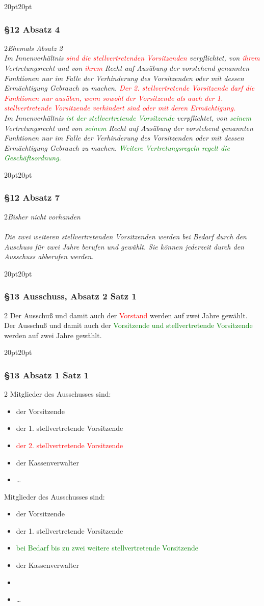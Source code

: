 \documentclass[10pt,a4paper,parskip=half]{scrartcl}
\newcommand{\new}[1]{\textcolor{Green}{#1}}
\newcommand{\old}[1]{\textcolor{Red}{#1}}
\newcommand{\change}[1]{
  \begin{adjustwidth}{20pt}{20pt}
    #1
  \end{adjustwidth}
}
\newcommand{\compare}[3]{\change{\subsubsection*{#1}\begin{multicols}{2}#2\columnbreak\\#3\end{multicols}}}
\begin{document}
\compare{§12 Absatz 4}
{\em Ehemals Absatz 2\em\\
  Im Innenverhältnis \old{sind die stellvertretenden Vorsitzenden} verpflichtet,
  von \old{ihrem} Vertretungsrecht und von \old{ihrem} Recht auf Ausübung der vorstehend genannten Funktionen nur im Falle der Verhinderung des Vorsitzenden oder mit dessen Ermächtigung Gebrauch zu machen.
  \old{Der 2. stellvertretende Vorsitzende darf die Funktionen nur ausüben,
    wenn sowohl der
    Vorsitzende als auch der 1. stellvertretende Vorsitzende verhindert sind oder mit deren Ermächtigung.}
}
{Im Innenverhältnis \new{ist der stellvertretende Vorsitzende} verpflichtet,
  von \new{seinem} Vertretungsrecht und von \new{seinem} Recht auf Ausübung der vorstehend genannten Funktionen nur im Falle der Verhinderung des Vorsitzenden oder mit dessen Ermächtigung Gebrauch zu machen. \new{Weitere Vertretungsregeln regelt die Geschäftsordnung.}}

\compare{§12 Absatz 7}
{\em Bisher nicht vorhanden\em\\}
{Die zwei weiteren stellvertretenden Vorsitzenden werden bei Bedarf durch den Auschuss für zwei Jahre berufen und gewählt. Sie können jederzeit durch den Ausschuss abberufen werden.}

\compare{§13 Ausschuss, Absatz 2 Satz 1}{
  Der Ausschuß und damit auch der \old{Vorstand} werden auf zwei Jahre gewählt.
}{
  Der Ausschuß und damit auch der \new{Vorsitzende und stellvertretende Vorsitzende} werden auf zwei Jahre gewählt.
}

\clearpage
\change{
  \subsubsection*{§13 Absatz 1 Satz 1}
  \begin{multicols}{2}
    Mitglieder des Ausschusses sind:
    \begin{itemize}[noitemsep]
      \item der Vorsitzende
      \item der 1. stellvertretende Vorsitzende
      \item \old{der 2. stellvertretende Vorsitzende}
      \item der Kassenverwalter
      \item \dots
    \end{itemize}
    \columnbreak
    Mitglieder des Ausschusses sind:
    \begin{itemize}[noitemsep]
      \item der Vorsitzende
      \item der 1. stellvertretende Vorsitzende
      \item \new{bei Bedarf bis zu zwei weitere stellvertretende Vorsitzende}
      \item der Kassenverwalter
      \item \item \dots
    \end{itemize}
  \end{multicols}
}
\end{document}
